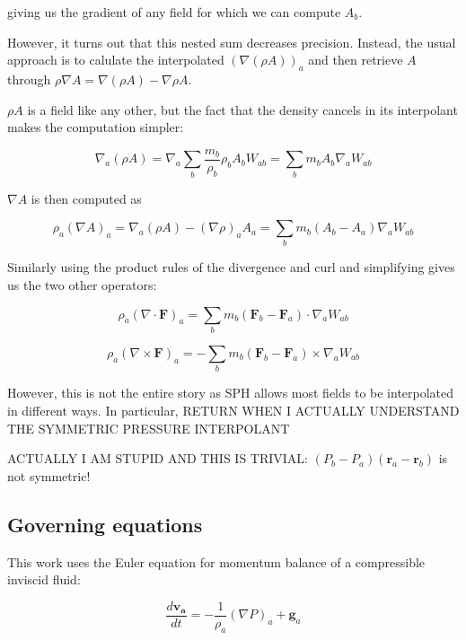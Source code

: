 \documentclass[../main.tex]{subfiles}
\begin{document}
giving us the gradient of any field for which we can compute $A_b$.

However, it turns out \autocite{monaghan1992} that this nested sum decreases precision. Instead, the usual approach is to calulate the interpolated $(\nabla(\rho A))_a$ and then retrieve $A$ through $\rho\nabla A = \nabla(\rho A) - \nabla\rho A$.

$\rho A$ is a field like any other, but the fact that the density cancels in its interpolant makes the computation simpler:

\begin{equation}
    \nabla_a (\rho A) = \nabla_a \sum_b \frac{m_b}{\rho_b} \rho_b A_b W_{ab} = \sum_b m_b A_b \nabla_a W_{ab}
\end{equation}

$\nabla A$ is then computed as

\begin{equation}
    \rho_a (\nabla A)_a = \nabla_a (\rho A) - (\nabla\rho)_a A_a = \sum_b m_b (A_b - A_a) \nabla_a W_{ab}
\end{equation}

Similarly using the product rules of the divergence and curl and simplifying gives us the two other operators:

\begin{equation}
    \rho_a (\nabla\cdot\bm{F})_a = \sum_b m_b (\bm{F}_b - \bm{F}_a) \cdot \nabla_a W_{ab}
\end{equation}

\begin{equation}
    \rho_a (\nabla\times\bm{F})_a = - \sum_b m_b (\bm{F}_b - \bm{F}_a) \times \nabla_a W_{ab}
\end{equation}

However, this is not the entire story as SPH allows most fields to be interpolated in different ways. In particular, RETURN WHEN I ACTUALLY UNDERSTAND THE SYMMETRIC PRESSURE INTERPOLANT

ACTUALLY I AM STUPID AND THIS IS TRIVIAL: $(P_b - P_a)(\bm{r}_a - \bm{r}_b)$ is not symmetric!


\subsection{Governing equations}

This work uses the Euler equation for momentum balance of a compressible inviscid fluid:

\begin{equation}
    \frac{d\bm{v_a}}{dt} = - \frac{1}{\rho_a} (\nabla P)_a + \bm{g}_a
\end{equation}
\end{document}
